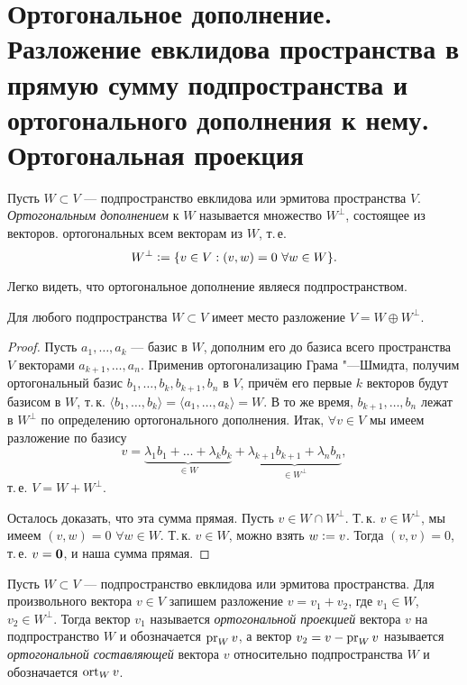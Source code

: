\section{Ортогональное дополнение. Разложение евклидова пространства в прямую сумму подпространства и ортогонального дополнения к нему. Ортогональная проекция}

\begin{definition}
    Пусть $W \subset V$ --- подпространство евклидова или эрмитова пространства $V$. \textit{Ортогональным дополнением} к $W$ называется множество $W^\perp$, состоящее из векторов. ортогональных всем векторам из $W$, т.\,е.
    \[
        W^\perp \vcentcolon = \{v \in V : (v, w) = 0\ \forall w \in W\}.
    \]
\end{definition}

Легко видеть, что ортогональное дополнение являеся подпространством.

\begin{proposal}
    Для любого подпространства $W \subset V$ имеет место разложение $V = W \oplus W^\perp$.
\end{proposal}

\begin{proof}
    Пусть $a_1, \ldots, a_k$ --- базис в $W$, дополним его до базиса всего пространства $V$ векторами $a_{k + 1}, \ldots, a_n$. Применив ортогонализацию Грама "---Шмидта, получим ортогональный базис $b_1, \ldots, b_k, b_{k + 1}, b_n$ в $V$, причём его первые $k$ векторов будут базисом в $W$, т.\,к. $\langle b_1, \ldots, b_k\rangle = \langle a_1, \ldots, a_k\rangle = W$. В то же время, $b_{k + 1}, \ldots, b_n$ лежат в $W^\perp$ по определению ортогонального дополнения. Итак, $\forall v \in V$ мы имеем разложение по базису
    \[
        v = \underbrace{\lambda_1b_1 + \ldots + \lambda_kb_k}_{{} \in W} + \underbrace{\lambda_{k + 1}b_{k + 1} + \lambda_nb_n}_{{} \in W^\perp},
    \]
    т.\,е. $V = W + W^\perp$.

    Осталось доказать, что эта сумма прямая. Пусть $v \in W \cap W^\perp$. Т.\,к. $v \in W^\perp$, мы имеем $(v, w) = 0$ $\forall w \in W$. Т.\,к. $v \in W$, можно взять $w \vcentcolon = v$. Тогда $(v, v) = 0$, т.\,е. $v = \boldsymbol{0}$, и наша сумма прямая.
\end{proof}

\begin{definition}
    Пусть $W \subset V$ --- подпространство евклидова или эрмитова пространства. Для произвольного вектора $v \in V$ запишем разложение $v = v_1 + v_2$, где $v_1 \in W$, $v_2 \in W^\perp$. Тогда вектор $v_1$ называется \textit{ортогональной проекцией} вектора $v$ на подпространство $W$ и обозначается $\operatorname{pr}_Wv$, а вектор $v_2 = v - \operatorname{pr}_Wv$ называется \textit{ортогональной составляющей} вектора $v$ относительно подпространства $W$ и обозначается $\operatorname{ort}_Wv$.
\end{definition}


